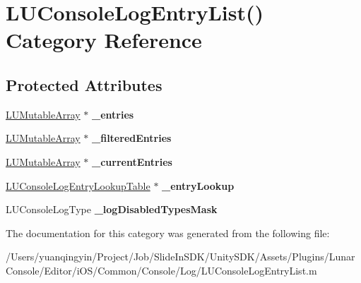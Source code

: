 \hypertarget{category_l_u_console_log_entry_list_07_08}{}\section{L\+U\+Console\+Log\+Entry\+List() Category Reference}
\label{category_l_u_console_log_entry_list_07_08}
\subsection*{Protected Attributes}
\begin{DoxyCompactItemize}
\item 
\mbox{\label{category_l_u_console_log_entry_list_07_08_a8b9bdfa6406c43276af4c942f8d40d07}} 
\mbox{\hyperlink{interface_l_u_mutable_array}{L\+U\+Mutable\+Array}} $\ast$ {\bfseries \+\_\+entries}
\item 
\mbox{\label{category_l_u_console_log_entry_list_07_08_a6f10bf5be5ae0b36b06c5bc88be20daf}} 
\mbox{\hyperlink{interface_l_u_mutable_array}{L\+U\+Mutable\+Array}} $\ast$ {\bfseries \+\_\+filtered\+Entries}
\item 
\mbox{\label{category_l_u_console_log_entry_list_07_08_a89dd0c129d25392e1d0a03327d516e65}} 
\mbox{\hyperlink{interface_l_u_mutable_array}{L\+U\+Mutable\+Array}} $\ast$ {\bfseries \+\_\+current\+Entries}
\item 
\mbox{\label{category_l_u_console_log_entry_list_07_08_ac7d0a4e0d21f073c02c1975cb9d0be42}} 
\mbox{\hyperlink{interface_l_u_console_log_entry_lookup_table}{L\+U\+Console\+Log\+Entry\+Lookup\+Table}} $\ast$ {\bfseries \+\_\+entry\+Lookup}
\item 
\mbox{\label{category_l_u_console_log_entry_list_07_08_adc90574d373f056f5f6edb19e6470d21}} 
L\+U\+Console\+Log\+Type {\bfseries \+\_\+log\+Disabled\+Types\+Mask}
\end{DoxyCompactItemize}


The documentation for this category was generated from the following file\+:\begin{DoxyCompactItemize}
\item 
/\+Users/yuanqingyin/\+Project/\+Job/\+Slide\+In\+S\+D\+K/\+Unity\+S\+D\+K/\+Assets/\+Plugins/\+Lunar\+Console/\+Editor/i\+O\+S/\+Common/\+Console/\+Log/L\+U\+Console\+Log\+Entry\+List.\+m\end{DoxyCompactItemize}
